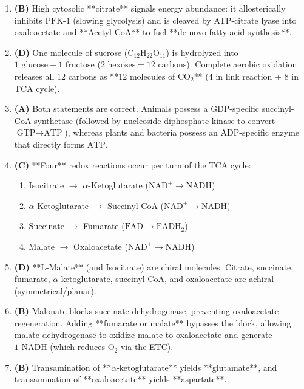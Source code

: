 \documentclass[11pt, a4paper]{article}
\begin{document}
\begin{enumerate}[label=\textbf{\arabic*.}]
\item \textbf{(B)} High cytosolic **citrate** signals energy abundance: it allosterically inhibits $\text{PFK-1}$ (slowing glycolysis) and is cleaved by ATP-citrate lyase into oxaloacetate and **Acetyl-CoA** to fuel **de novo fatty acid synthesis**.

\item \textbf{(D)} One molecule of sucrose ($\text{C}_{12}\text{H}_{22}\text{O}_{11}$) is hydrolyzed into $1\text{ glucose} + 1\text{ fructose}$ ($2\text{ hexoses} = 12\text{ carbons}$). Complete aerobic oxidation releases all $12\text{ carbons}$ as **$12\text{ molecules}$ of $\text{CO}_2$** ($4$ in link reaction + $8$ in TCA cycle).

\item \textbf{(A)} Both statements are correct. Animals possess a GDP-specific succinyl-CoA synthetase (followed by nucleoside diphosphate kinase to convert $\text{GTP} \rightarrow \text{ATP}$), whereas plants and bacteria possess an ADP-specific enzyme that directly forms $\text{ATP}$.

\item \textbf{(C)} **Four** redox reactions occur per turn of the TCA cycle:
\begin{enumerate}
    \item Isocitrate $\rightarrow$ $\alpha$-Ketoglutarate ($\text{NAD}^+ \rightarrow \text{NADH}$)
    \item $\alpha$-Ketoglutarate $\rightarrow$ Succinyl-CoA ($\text{NAD}^+ \rightarrow \text{NADH}$)
    \item Succinate $\rightarrow$ Fumarate ($\text{FAD} \rightarrow \text{FADH}_2$)
    \item Malate $\rightarrow$ Oxaloacetate ($\text{NAD}^+ \rightarrow \text{NADH}$)
\end{enumerate}

\item \textbf{(D)} **L-Malate** (and Isocitrate) are chiral molecules. Citrate, succinate, fumarate, $\alpha$-ketoglutarate, succinyl-CoA, and oxaloacetate are achiral (symmetrical/planar).

\item \textbf{(B)} Malonate blocks succinate dehydrogenase, preventing oxaloacetate regeneration. Adding **fumarate or malate** bypasses the block, allowing malate dehydrogenase to oxidize malate to oxaloacetate and generate $1\text{ NADH}$ (which reduces $\text{O}_2$ via the ETC).

\item \textbf{(B)} Transamination of **$\alpha$-ketoglutarate** yields **glutamate**, and transamination of **oxaloacetate** yields **aspartate**.


\end{enumerate}
\end{document}
